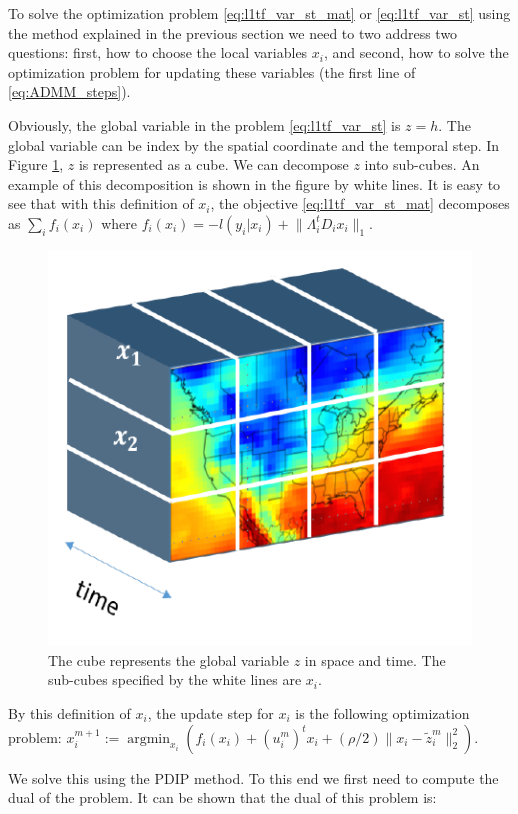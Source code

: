\documentclass[review]{elsarticle}
\DeclareMathOperator*{\argmin}{argmin}
\begin{document}
To solve the optimization problem \ref{eq:l1tf_var_st_mat} or \ref{eq:l1tf_var_st} using the method explained in the previous section we need to two address two questions: first, how to choose the local variables $x_i$, and second, how to solve the optimization problem for updating these variables (the first line of \ref{eq:ADMM_steps}). 

Obviously, the global variable in the problem \ref{eq:l1tf_var_st} is $z=h$. The global variable can be index by the spatial coordinate and the temporal step. In Figure \ref{fig:data_cube}, $z$ is represented as a cube. We can decompose $z$ into sub-cubes. An example of this decomposition is shown in the figure by white lines. It is easy to see that with this definition of $x_i$, the objective \ref{eq:l1tf_var_st_mat} decomposes as $\sum_i f_i(x_i)$ where $f_i(x_i)=-l(y_i|x_i)+\lVert \Lambda_i^t D_ix_i \lVert_1$. 


\begin{figure}[ht]
	\vskip 0.2in
	\begin{center}
		\centerline{\includegraphics[width=.5\columnwidth]{Figures/data_cube}}
		\caption{The cube represents the global variable $z$ in space and time. The sub-cubes specified by the white lines are $x_i$.}
		\label{fig:data_cube}
	\end{center}
	\vskip -0.2in
\end{figure} 

By this definition of $x_i$, the update step for $x_i$ is the following optimization problem: $x_i^{m+1}:=\argmin_{x_i} ( f_i(x_i) + (u_i^m)^t x_i + (\rho/2) \lVert x_i-\tilde{z}_i^m \lVert_2^2)$.

We solve this using the PDIP method. To this end we first need to compute the dual of the problem. It can be shown that the dual of this problem is:

\end{document}
